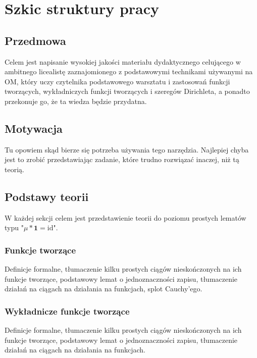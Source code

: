 \documentclass[shortabstract]{imthesis}
\author         {Bartosz Chomiński}
\date           {PROJEKT}
\begin{document}

\chapter{Szkic struktury pracy}

\section{Przedmowa}

Celem jest napisanie wysokiej jakości materiału dydaktycznego celującego w ambitnego licealistę zaznajomionego z podstawowymi technikami używanymi na OM, który uczy czytelnika podstawowego warsztatu i zastosowań funkcji tworzących, wykładniczych funkcji tworzących i szeregów Dirichleta, a ponadto przekonuje go, że ta wiedza będzie przydatna.

\section{Motywacja}

Tu opowiem skąd bierze się potrzeba używania tego narzędzia. Najlepiej chyba jest to zrobić przedstawiając zadanie, które trudno rozwiązać inaczej, niż tą teorią.

\section{Podstawy teorii}

W każdej sekcji celem jest przedstawienie teorii do poziomu prostych lematów typu "$\mu * \mathbf{1} = \mathrm{id}$".

\subsection{Funkcje tworzące}

Definicje formalne, tłumaczenie kilku prostych ciągów nieskończonych na ich funkcje tworzące, podstawowy lemat o jednoznaczności zapisu, tłumaczenie działań na ciągach na działania na funkcjach, splot Cauchy'ego.

\subsection{Wykładnicze funkcje tworzące}

Definicje formalne, tłumaczenie kilku prostych ciągów nieskończonych na ich funkcje tworzące, podstawowy lemat o jednoznaczności zapisu, tłumaczenie działań na ciągach na działania na funkcjach.
\end{document}
